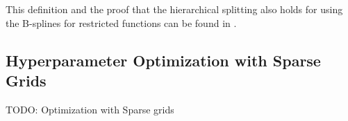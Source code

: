 This definition and the proof that the hierarchical splitting also holds for using the B-splines for restricted functions can be found in \cite{b_splines}.

\subsection{Hyperparameter Optimization with Sparse Grids}

TODO: Optimization with Sparse grids

